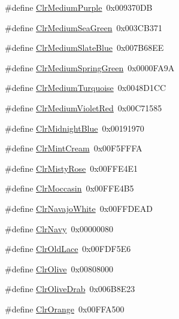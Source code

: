 \begin{DoxyCompactItemize}
\item 
\#define \hyperlink{group__primitives__api_ga6db25af2c81e95c645a88f945547dac5}{Clr\+Medium\+Purple}~0x009370\+D\+B
\item 
\#define \hyperlink{group__primitives__api_ga9fb6bf060c405011d890c3c54ee2c4eb}{Clr\+Medium\+Sea\+Green}~0x003\+C\+B371
\item 
\#define \hyperlink{group__primitives__api_gae1d40187ca47362be09ddc2e41d8a0f0}{Clr\+Medium\+Slate\+Blue}~0x007\+B68\+E\+E
\item 
\#define \hyperlink{group__primitives__api_ga57ae7a92ebac0333e6235d0dfb302eba}{Clr\+Medium\+Spring\+Green}~0x0000\+F\+A9\+A
\item 
\#define \hyperlink{group__primitives__api_ga3a4f532a69a2d3e302bc131d395224a2}{Clr\+Medium\+Turquoise}~0x0048\+D1\+C\+C
\item 
\#define \hyperlink{group__primitives__api_ga1dba6f31661b7f3b6b9378111a64ba93}{Clr\+Medium\+Violet\+Red}~0x00\+C71585
\item 
\#define \hyperlink{group__primitives__api_ga0e791fdc34a159add3ed8e11a3ec70e6}{Clr\+Midnight\+Blue}~0x00191970
\item 
\#define \hyperlink{group__primitives__api_ga5123321f499ec3eb61bbe5743e03624d}{Clr\+Mint\+Cream}~0x00\+F5\+F\+F\+F\+A
\item 
\#define \hyperlink{group__primitives__api_ga2972b2e6fa3c658675b6850fa4748268}{Clr\+Misty\+Rose}~0x00\+F\+F\+E4\+E1
\item 
\#define \hyperlink{group__primitives__api_gab7a04a6a2412f1fd1d6bf45dbd048ee6}{Clr\+Moccasin}~0x00\+F\+F\+E4\+B5
\item 
\#define \hyperlink{group__primitives__api_ga74b81fdf57b66adb950c6c2994eae7e0}{Clr\+Navajo\+White}~0x00\+F\+F\+D\+E\+A\+D
\item 
\#define \hyperlink{group__primitives__api_gae1499a7cfa106958d98ee7583d41e30e}{Clr\+Navy}~0x00000080
\item 
\#define \hyperlink{group__primitives__api_gafaabd4a7620e35bed794d8e660e65296}{Clr\+Old\+Lace}~0x00\+F\+D\+F5\+E6
\item 
\#define \hyperlink{group__primitives__api_ga3325bbf7655b1f7abe16fe77440d594f}{Clr\+Olive}~0x00808000
\item 
\#define \hyperlink{group__primitives__api_ga385740d00f587674bcc6b58422a87995}{Clr\+Olive\+Drab}~0x006\+B8\+E23
\item 
\#define \hyperlink{group__primitives__api_ga28a38dccae31481c254115c65d8246f0}{Clr\+Orange}~0x00\+F\+F\+A500
\item 

\end{DoxyCompactItemize}
